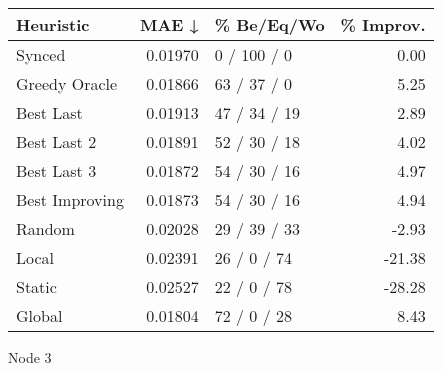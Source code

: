 \begin{tabular}{lrlr}
\toprule
\textbf{Heuristic} & \textbf{MAE ↓} & \textbf{\% Be/Eq/Wo} & \textbf{\% Improv.} \\
\midrule
            Synced &        0.01970 &          0 / 100 / 0 &                0.00 \\
     Greedy Oracle &        0.01866 &          63 / 37 / 0 &                5.25 \\
         Best Last &        0.01913 &         47 / 34 / 19 &                2.89 \\
       Best Last 2 &        0.01891 &         52 / 30 / 18 &                4.02 \\
       Best Last 3 &        0.01872 &         54 / 30 / 16 &                4.97 \\
    Best Improving &        0.01873 &         54 / 30 / 16 &                4.94 \\
            Random &        0.02028 &         29 / 39 / 33 &               -2.93 \\
             Local &        0.02391 &          26 / 0 / 74 &              -21.38 \\
            Static &        0.02527 &          22 / 0 / 78 &              -28.28 \\
            Global &        0.01804 &          72 / 0 / 28 &                8.43 \\
\bottomrule
\end{tabular}
\caption{Node 3}
\label{tab:iid_lr05_le2_bs2_3}
